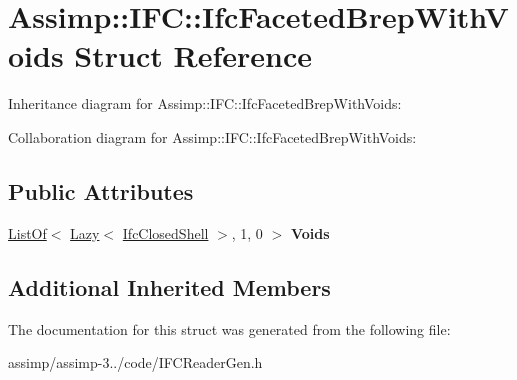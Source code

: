 \hypertarget{struct_assimp_1_1_i_f_c_1_1_ifc_faceted_brep_with_voids}{\section{Assimp\+:\+:I\+F\+C\+:\+:Ifc\+Faceted\+Brep\+With\+Voids Struct Reference}
\label{struct_assimp_1_1_i_f_c_1_1_ifc_faceted_brep_with_voids}
}


Inheritance diagram for Assimp\+:\+:I\+F\+C\+:\+:Ifc\+Faceted\+Brep\+With\+Voids\+:


Collaboration diagram for Assimp\+:\+:I\+F\+C\+:\+:Ifc\+Faceted\+Brep\+With\+Voids\+:
\subsection*{Public Attributes}
\begin{DoxyCompactItemize}
\item 
\hypertarget{struct_assimp_1_1_i_f_c_1_1_ifc_faceted_brep_with_voids_a103e81b9da33929ba41a2f09458fd02d}{\hyperlink{struct_assimp_1_1_s_t_e_p_1_1_list_of}{List\+Of}$<$ \hyperlink{struct_assimp_1_1_s_t_e_p_1_1_lazy}{Lazy}$<$ \hyperlink{struct_assimp_1_1_i_f_c_1_1_ifc_closed_shell}{Ifc\+Closed\+Shell} $>$, 1, 0 $>$ {\bfseries Voids}}\label{struct_assimp_1_1_i_f_c_1_1_ifc_faceted_brep_with_voids_a103e81b9da33929ba41a2f09458fd02d}

\end{DoxyCompactItemize}
\subsection*{Additional Inherited Members}


The documentation for this struct was generated from the following file\+:\begin{DoxyCompactItemize}
\item 
assimp/assimp-\/3../code/I\+F\+C\+Reader\+Gen.\+h\end{DoxyCompactItemize}
